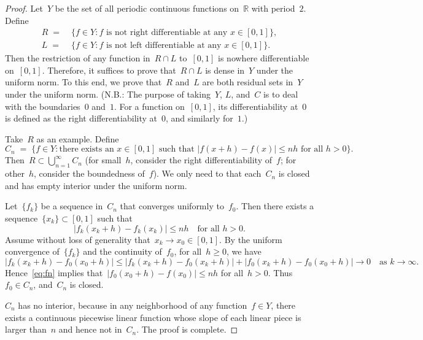 \documentclass[11pt,a4paper]{article}  %
\theoremstyle{definition}
\newcommand{\RR}{\mathbb{R}}
\numberwithin{equation}{section}
\begin{document}
\begin{proof}
    Let~$Y$ be the set of all periodic continuous functions on~$\RR$ with period~$2$.
    Define
    \begin{align*}
        R \;=\; & \{f \in Y \mathrel{:} f \text{ is not right differentiable  at any } x \in [0,1]\},
        \\
        L \;=\; & \{f \in Y \mathrel{:} f \text{ is not left differentiable  at any } x \in [0,1]\}.
    \end{align*}
    Then the restriction of any function in~$R\cap L$ to~$[0,1]$ is nowhere differentiable
    on~$[0,1]$.
    Therefore, it suffices to prove that~$R \cap L$ is dense in~$Y$ under the uniform norm.
    To this end, we prove that~$R$ and~$L$ are both residual sets in~$Y$ under the uniform norm.
    (N.B.: The purpose of taking~$Y$, $L$, and~$C$ is to deal with the boundaries~$0$ and~$1$.
    For a function on~$[0,1]$, its differentiability at~$0$ is defined as the right
differentiability at~$0$, and similarly for~$1$.)

    Take~$R$ as an example.
    Define
    \[
        C_n \;=\; \{f \in Y \mathrel{:} \text{there exists an }x\in[0,1] \text{ such that } |f(x+h)
        - f(x)| \le nh \text{ for all } h> 0\}.
    \]
    Then~$R \subset \bigcup_{n=1}^\infty C_n$ (for small~$h$, consider the right differentiability of~$f$; for
    other~$h$, consider the boundedness of~$f$). We only need to that each~$C_n$ is closed and has empty
    interior under the uniform norm.

    Let~$\{f_k\}$ be a sequence in~$C_n$ that converges uniformly to~$f_0$.
    Then there exists a
    sequence~$\{x_k\} \subset[0,1]$ such that
    \begin{equation}
        \label{eq:fn}
      |f_k(x_k+h) - f_k(x_k)| \le nh \quad \text{for all~} h>0.
    \end{equation}
    Assume without loss of generality that~$x_k\to x_0\in[0,1]$. By the uniform
convergence of~$\{f_k\}$ and the continuity of~$f_0$, for all~$h\ge 0$, we have
    \[
    |f_k(x_k + h)- f_0(x_0 + h)| \le |f_k(x_k + h) - f_0(x_k +h)| + |f_0(x_k + h) - f_0(x_0 +h)|
        \to 0 \quad \text{as } k\to \infty.
    \]
    Hence~\eqref{eq:fn} implies that~$|f_0(x_0+h) - f(x_0)| \le nh$ for all~$h>0$. Thus~$f_0\in C_n$,
    and~$C_n$ is closed.

    $C_n$ has no interior, because in any neighborhood of any function~$f\in Y$, there exists a
    continuous piecewise linear function whose slope of each linear piece is larger than~$n$ and
    hence not in~$C_n$. The proof is complete.
\end{proof}
\end{document}
